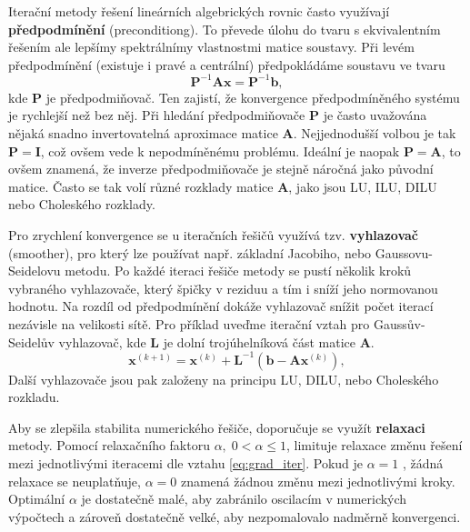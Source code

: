 \documentclass[a4paper,12pt]{report}
\theoremstyle{remark}
\begin{document}
	Iterační metody řešení lineárních algebrických rovnic často využívají \textbf{předpodmínění} (preconditiong). To převede úlohu do tvaru s ekvivalentním řešením ale lepšímy spektrálnímy vlastnostmi matice soustavy.  Při levém předpodmínění (existuje i pravé a centrální) předpokládáme soustavu ve tvaru
\begin{equation}
	\boldsymbol{P}^{-1}\boldsymbol{A}\boldsymbol{x} =\boldsymbol{P}^{-1}\boldsymbol{b},
\end{equation}
kde $\boldsymbol{P}$ je předpodmiňovač. Ten zajistí, že konvergence předpodmíněného systému je rychlejší než bez něj. Při hledání předpodmiňovače $\boldsymbol{P}$ je často uvažována nějaká snadno invertovatelná aproximace matice $\boldsymbol{A}$. Nejjednodušší volbou je tak $\boldsymbol{P} = \boldsymbol{I}$, což ovšem vede k nepodmíněnému problému. Ideální je naopak $\boldsymbol{P} = \boldsymbol{A}$, to ovšem znamená, že inverze předpodmiňovače je stejně náročná jako původní matice. Často se tak volí různé rozklady matice $\boldsymbol{A}$, jako jsou LU, ILU, DILU nebo Choleského rozklady.
	
	Pro zrychlení konvergence se u iteračních řešičů využívá tzv. \textbf{vyhlazovač} (smoother), pro který lze používat např. základní Jacobiho, nebo Gaussovu-Seidelovu metodu. Po každé iteraci řešiče metody se pustí několik kroků vybraného vyhlazovače, který  špičky v reziduu a tím i sníží jeho normovanou hodnotu. Na rozdíl od předpodmínění dokáže vyhlazovač snížit počet iterací nezávisle na velikosti sítě. Pro příklad uveďme iterační vztah pro Gaussův-Seidelův vyhlazovač, kde $\boldsymbol{L}$ je dolní trojúhelníková část matice $\boldsymbol{A}$.
	\begin{equation}
		\boldsymbol{x} ^{(k+1)} = \boldsymbol{x}^{(k)} +\boldsymbol{L}^{-1}(\boldsymbol{b} -  \boldsymbol{A}\boldsymbol{x} ^{(k)}),
		\label{eq:gs_smoother}
	\end{equation}
Další vyhlazovače jsou pak založeny na principu LU, DILU, nebo Choleského rozkladu.
	
	Aby se zlepšila stabilita numerického řešiče, doporučuje se využít \textbf{relaxaci} metody. Pomocí relaxačního faktoru $\alpha,\; 0 < \alpha \leq 1 $, limituje relaxace změnu řešení mezi jednotlivými iteracemi dle vztahu \eqref{eq:grad_iter}. Pokud je   $\alpha = 1$ , žádná relaxace se neuplatňuje, $\alpha = 0$ znamená žádnou změnu mezi jednotlivými kroky.   Optimální $\alpha$ je dostatečně malé, aby zabránilo oscilacím v numerických výpočtech a zároveň dostatečně velké, aby nezpomalovalo nadměrně konvergenci. 
	
\end{document}
